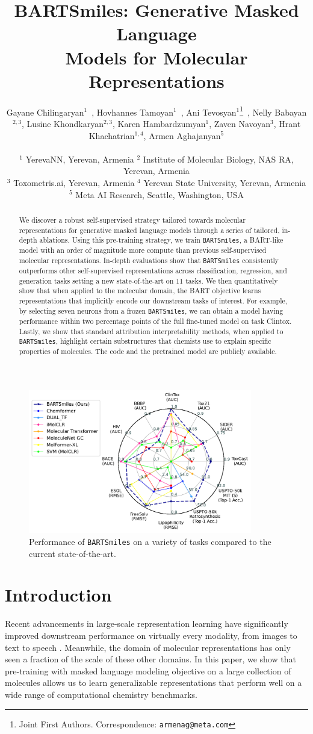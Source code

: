 \documentclass{article} %
\title{BARTSmiles: Generative Masked Language \\Models for Molecular Representations}
\author{Gayane Chilingaryan$^1$\footnotemark[1]\ , Hovhannes Tamoyan$^1$\footnotemark[1]\ , Ani Tevosyan$^1$\thanks{Joint First Authors. Correspondence: \texttt{armenag@meta.com}}\ , Nelly Babayan$^{2,3}$, \vspace{-2cm} 
\And
Lusine Khondkaryan$^{2,3}$, Karen Hambardzumyan$^1$, Zaven Navoyan$^3$, Hrant Khachatrian$^{1,4}$, \vspace{-2cm}
\And Armen Aghajanyan$^5$ \\ \\
$^1$ YerevaNN, Yerevan, Armenia %
$^2$ Institute of Molecular Biology, NAS RA, Yerevan, Armenia \\
$^3$ Toxometris.ai, Yerevan, Armenia %
$^4$ Yerevan State University, Yerevan, Armenia \\
$^5$ Meta AI Research, Seattle, Washington, USA \vspace{-0.5cm}
}
\newcommand{\MODEL}{\texttt{BARTSmiles}}
\begin{document}
\maketitle
\begin{abstract}
We discover a robust self-supervised strategy tailored towards molecular representations for generative masked language models through a series of tailored, in-depth ablations. Using this pre-training strategy, we train \MODEL{}, a BART-like model with an order of magnitude more compute than previous self-supervised molecular representations. In-depth evaluations show that \MODEL{} consistently outperforms other self-supervised representations across classification, regression, and generation tasks setting a new state-of-the-art on 11 tasks. We then quantitatively show that when applied to the molecular domain, the BART objective learns representations that implicitly encode our downstream tasks of interest. For example, by selecting seven neurons from a frozen \MODEL{}, we can obtain a model having performance within two percentage points of the full fine-tuned model on task Clintox. Lastly, we show that standard attribution interpretability methods, when applied to \MODEL{}, highlight certain substructures that chemists use to explain specific properties of molecules. The code and the pretrained model are publicly available.
\end{abstract}


\begin{figure}[h!]
    \includegraphics[width=0.87\textwidth]{figures/cycle_.pdf}
    \caption{Performance of \MODEL{} on a variety of tasks compared to the current state-of-the-art.}
\end{figure}

\section{Introduction}
Recent advancements in large-scale representation learning have significantly improved downstream performance on virtually every modality, from images \citet{CM3, BEIT, MAE} to text \citet{ROBERTA, MARGE, HTLM1} to speech \citet{XLSR, WHISPER}. Meanwhile, the domain of molecular representations has only seen a fraction of the scale of these other domains. In this paper, we show that pre-training with masked language modeling objective on a large collection of molecules allows us to learn generalizable representations that perform well on a wide range of computational chemistry benchmarks.
\end{document}
